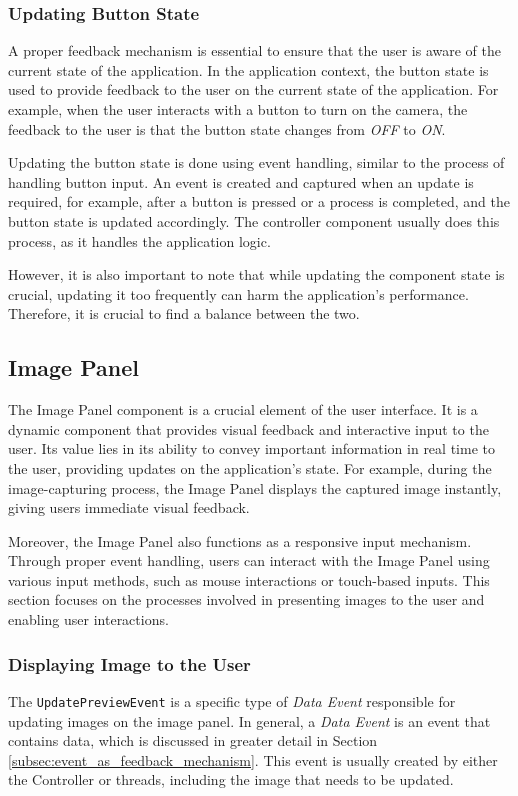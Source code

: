 \subsubsection{Updating Button State}
A proper feedback mechanism is essential to ensure that the user is aware of the current state of the application. In the application context, the button state is used to provide feedback to the user on the current state of the application. For example, when the user interacts with a button to turn on the camera, the feedback to the user is that the button state changes from \textit{OFF} to \textit{ON}.

Updating the button state is done using event handling, similar to the process of handling button input. An event is created and captured when an update is required, for example, after a button is pressed or a process is completed, and the button state is updated accordingly. The controller component usually does this process, as it handles the application logic.

However, it is also important to note that while updating the component state is crucial, updating it too frequently can harm the application's performance. Therefore, it is crucial to find a balance between the two.

\subsection{Image Panel}
\label{subsec:image_panel}
The Image Panel component is a crucial element of the user interface. It is a dynamic component that provides visual feedback and interactive input to the user. Its value lies in its ability to convey important information in real time to the user, providing updates on the application's state. For example, during the image-capturing process, the Image Panel displays the captured image instantly, giving users immediate visual feedback.

Moreover, the Image Panel also functions as a responsive input mechanism. Through proper event handling, users can interact with the Image Panel using various input methods, such as mouse interactions or touch-based inputs. This section focuses on the processes involved in presenting images to the user and enabling user interactions.

\subsubsection{Displaying Image to the User}
The \texttt{UpdatePreviewEvent} is a specific type of \textit{Data Event} responsible for updating images on the image panel. In general, a \textit{Data Event} is an event that contains data, which is discussed in greater detail in Section \ref{subsec:event_as_feedback_mechanism}. This event is usually created by either the Controller or threads, including the image that needs to be updated.

